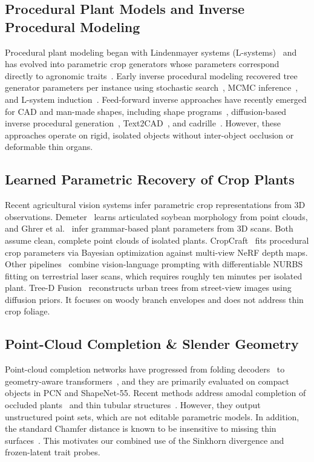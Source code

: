\documentclass[10pt,twocolumn,letterpaper]{article}
\begin{document}
\subsection{Procedural Plant Models and Inverse Procedural Modeling}
Procedural plant modeling began with Lindenmayer systems (L-systems)~\citep{prusin1990abop} and has evolved into parametric crop generators whose parameters correspond directly to agronomic traits~\citep{floraforge2026,hadadi2025procmaize}. Early inverse procedural modeling recovered tree generator parameters per instance using stochastic search~\citep{stava2014ipmtrees}, MCMC inference~\citep{talton2011metropolis}, and L-system induction~\citep{guo2020ipmlsys,latentlsys2023}. Feed-forward inverse approaches have recently emerged for CAD and man-made shapes, including shape programs~\citep{shapeprograms2019}, diffusion-based inverse procedural generation~\citep{zhao2025dipcg}, Text2CAD~\citep{text2cad2024}, and cadrille~\citep{kolodiazhnyi2025cadrille}. However, these approaches operate on rigid, isolated objects without inter-object occlusion or deformable thin organs.

\subsection{Learned Parametric Recovery of Crop Plants}
Recent agricultural vision systems infer parametric crop representations from 3D observations. Demeter~\citep{demeter2025} learns articulated soybean morphology from point clouds, and Ghrer et al.~\citep{ghrer2025paramplants} infer grammar-based plant parameters from 3D scans. Both assume clean, complete point clouds of isolated plants. CropCraft~\citep{cropcraft2026} fits procedural crop parameters via Bayesian optimization against multi-view NeRF depth maps. Other pipelines~\citep{hadadi2026vlmmaize,hadadi2025procmaize,nurbsdiff2022} combine vision-language prompting with differentiable NURBS fitting on terrestrial laser scans, which requires roughly ten minutes per isolated plant. Tree-D Fusion~\citep{lee2024treedfusion} reconstructs urban trees from street-view images using diffusion priors. It focuses on woody branch envelopes and does not address thin crop foliage.

\subsection{Point-Cloud Completion \& Slender Geometry}
Point-cloud completion networks have progressed from folding decoders~\citep{yuan2018pcn} to geometry-aware transformers~\citep{yu2021pointr,yu2023adapointr,cai2024einet}, and they are primarily evaluated on compact objects in PCN and ShapeNet-55. Recent methods address amodal completion of occluded plants~\citep{lee2026occ} and thin tubular structures~\citep{curvegaussian2025,qi2026rethinking}. However, they output unstructured point sets, which are not editable parametric models. In addition, the standard Chamfer distance is known to be insensitive to missing thin surfaces~\citep{wu2021dcd,song2026structural,lin2023infocd}. This motivates our combined use of the Sinkhorn divergence and frozen-latent trait probes.
\end{document}
